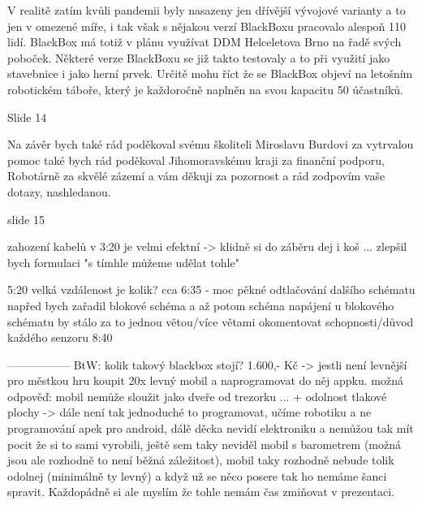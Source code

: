 V realitě zatím kvůli pandemii byly nasazeny jen dřívější vývojové varianty 
a to jen v omezené míře, i tak však s nějakou verzí BlackBoxu 
pracovalo alespoň 110 lidí.
BlackBox má totiž v plánu využívat DDM Helceletova Brno na řadě svých poboček.
Některé verze BlackBoxu se již takto testovaly a to při využití jako stavebnice 
i jako herní prvek. Určitě mohu říct že se BlackBox objeví 
na letošním robotickém táboře, který je každoročně naplněn na svou kapacitu 50 účastníků. 


Slide 14

Na závěr bych také rád poděkoval svému školiteli Miroslavu Burdovi za vytrvalou pomoc
také bych rád poděkoval Jihomoravskému kraji za finanční podporu, 
Robotárně za skvělé zázemí 
a vám děkuji za pozornost a rád zodpovím vaše dotazy, nashledanou.

slide 15 




zahození kabelů v 3:20 je velmi efektní -> klidně si do záběru dej i koš ... 
zlepšil bych formulaci "s tímhle můžeme udělat tohle" %

5:20 velká vzdálenost je kolik? %
cca 6:35 - moc pěkné odtlačování dalšího schématu 
napřed bych zařadil blokové schéma a až potom schéma napájení 
u blokového schématu by stálo za to jednou větou/více větami okomentovat schopnosti/důvod každého senzoru 
8:40  

-----------------
BtW: kolik takový blackbox stojí? 1.600,- Kč -> jestli není levnější 
pro městkou hru koupit 20x levný mobil a naprogramovat do něj appku.    
možná odpověď: mobil nemůže sloužit jako dveře od trezorku ...  + odolnost tlakové plochy -> dále není tak jednoduché to programovat, učíme robotiku a ne programování apek pro android, dálě děcka nevidí elektroniku a nemůžou tak mít pocit že si to sami vyrobili, ještě sem taky neviděl mobil s barometrem (možná jsou ale rozhodně to není běžná záležitost), mobil taky rozhodně nebude tolik odolnej (minimálně ty levný) a když už se něco posere tak ho nemáme šanci spravit. Každopádně si ale myslím že tohle nemám čas zmiňovat v prezentaci.